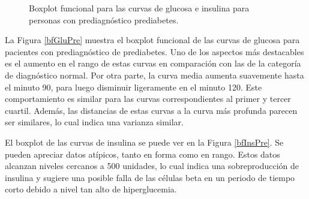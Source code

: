 \begin{figure}[H]
 \centering
    \caption{Boxplot funcional para las curvas de glucosa e insulina para personas con prediagnóstico prediabetes.}
    \label{fig:bfPrediabetes}
\end{figure}

La Figura \ref{bfGluPre} muestra el boxplot funcional de las curvas de glucosa para pacientes con prediagnóstico de prediabetes. Uno de los aspectos más destacables es el aumento en el rango de estas curvas en comparación con las de la categoría de diagnóstico normal. Por otra parte, la curva media aumenta suavemente hasta el minuto 90, para luego disminuir ligeramente en el minuto 120. Este comportamiento es similar para las curvas correspondientes al primer y tercer cuartil. Además, las distancias de estas curvas a la curva más profunda parecen ser similares, lo cual indica una varianza similar.

El boxplot de las curvas de insulina se puede ver en la Figura \ref{bfInsPre}. Se pueden apreciar datos atípicos, tanto en forma como en rango. Estos datos alcanzan niveles cercanos a 500 unidades, lo cual indica una sobreproducción de insulina y sugiere una posible falla de las células beta en un periodo de tiempo corto debido a nivel tan alto de hiperglucemia.

